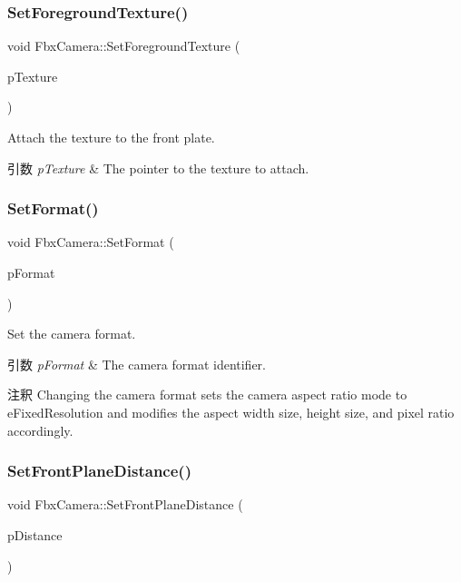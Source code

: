 \subsubsection{\texorpdfstring{Set\+Foreground\+Texture()}{SetForegroundTexture()}}
{\footnotesize\ttfamily void Fbx\+Camera\+::\+Set\+Foreground\+Texture (\begin{DoxyParamCaption}\item[{\hyperlink{class_fbx_texture}{Fbx\+Texture} $\ast$}]{p\+Texture }\end{DoxyParamCaption})}

Attach the texture to the front plate. 
\begin{DoxyParams}{引数}
{\em p\+Texture} & The pointer to the texture to attach. \\
\hline
\end{DoxyParams}
\mbox{\label{class_fbx_camera_a49db13fb34e3cfa618823e61511f5312}} 
\subsubsection{\texorpdfstring{Set\+Format()}{SetFormat()}}
{\footnotesize\ttfamily void Fbx\+Camera\+::\+Set\+Format (\begin{DoxyParamCaption}\item[{\hyperlink{class_fbx_camera_a88d68c983d21e4d6c0f281a8a30f0a06}{E\+Format}}]{p\+Format }\end{DoxyParamCaption})}

Set the camera format. 
\begin{DoxyParams}{引数}
{\em p\+Format} & The camera format identifier. \\
\hline
\end{DoxyParams}
\begin{DoxyRemark}{注釈}
Changing the camera format sets the camera aspect ratio mode to e\+Fixed\+Resolution and modifies the aspect width size, height size, and pixel ratio accordingly. 
\end{DoxyRemark}
\mbox{\label{class_fbx_camera_ad86c6e9e2fa9c9fdabc0323d18ab9dee}} 
\subsubsection{\texorpdfstring{Set\+Front\+Plane\+Distance()}{SetFrontPlaneDistance()}}
{\footnotesize\ttfamily void Fbx\+Camera\+::\+Set\+Front\+Plane\+Distance (\begin{DoxyParamCaption}\item[{double}]{p\+Distance }\end{DoxyParamCaption})}

